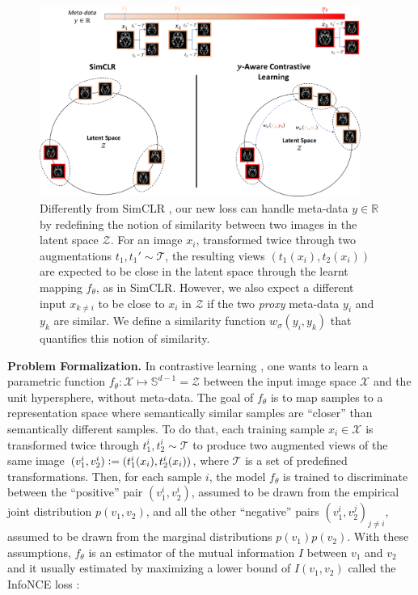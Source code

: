 \documentclass[runningheads]{llncs}
\newcommand{\defeq}{\vcentcolon=}
\newcommand{\virg}[1]{``#1''}
\begin{document}
\begin{figure}
    \centering
    \includegraphics[width=10.5cm]{y-AwareInfoNCEv3.pdf}
    \caption{Differently from SimCLR \cite{chen2020simCLR}, our new loss can handle meta-data $y\in \mathbb{R}$ by redefining the notion of similarity between two images in the latent space $\mathcal{Z}$. For an image $x_i$, transformed twice through two augmentations $t_1, t_1'\sim \mathcal{T}$, the resulting views $(t_1(x_i), t_2(x_i))$ are expected to be close in the latent space  through the learnt mapping $f_\theta$, as in SimCLR. However, we also expect a different input $x_{k\neq i}$ to be close to $x_i$ in $\mathcal{Z}$ if the two \textit{proxy} meta-data $y_i$ and $y_k$ are similar. We define a similarity function $w_\sigma(y_i, y_k)$ that quantifies this notion of similarity.}
\end{figure}



\textbf{Problem Formalization.} In contrastive learning \cite{chen2020simCLR, khosla2020, tian2020}, one wants to learn a parametric function $f_\theta: \mathcal{X} \mapsto \mathbb{S}^{d-1}=\mathcal{Z}$ between the input image space $\mathcal{X}$ and the unit hypersphere, without meta-data. The goal of $f_\theta$ is to map samples to a representation space where semantically similar samples are \virg{closer} than semantically different samples. To do that, each training sample $x_i\in \mathcal{X}$ is transformed twice through $t_1^i, t_2^i\sim \mathcal{T}$ to produce two augmented views of the same image $(v_1^i, v_2^i)\defeq (t_1^i(x_i), t_2^i(x_i))$, where $\mathcal{T}$ is a set of predefined transformations. Then, for each sample $i$, the model $f_\theta$ is trained to discriminate between the \virg{positive} pair $(v_1^i, v_2^i)$, assumed to be drawn from the empirical joint distribution $p(v_1, v_2)$, and all the other \virg{negative} pairs $(v_1^i, v_2^j)_{j\neq i}$, assumed to be drawn from the marginal distributions $p(v_1)p(v_2)$. With these assumptions, $f_\theta$ is an estimator of the mutual information $I$ between $v_1$ and $v_2$ and it usually estimated by maximizing a lower bound of $I(v_1, v_2)$ called the InfoNCE loss \cite{oord2018representation}:
\end{document}
